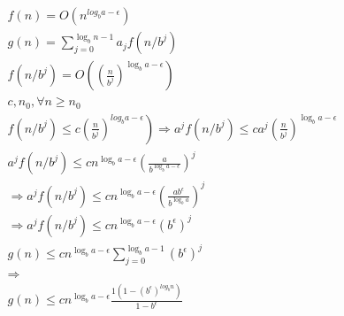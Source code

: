 $$
  \begin{array}{l}
    f(n)=O\left(n^{l o g_{b} a-\epsilon}\right)                                                                                                                                                              \\
    g(n)=\sum_{j=0}^{\log _{b} n-1} a_{j} f\left(n / b^{j}\right)                                                                                                                                            \\
    f\left(n / b^{j}\right)=O\left(\left(\frac{n}{b^{j}}\right)^{\log _{b} a-\epsilon}\right)                                                                                                                \\
    c, n_{0}, \forall n \geq n_{0}                                                                                                                                                                           \\
    \left.f\left(n / b^{j}\right) \leq c\left(\frac{n}{b^{j}}\right)^{l o g_{b} a-\epsilon}\right) \Rightarrow a^{j} f\left(n / b^{j}\right) \leq c a^{j}\left(\frac{n}{b^{j}}\right)^{\log _{b} a-\epsilon} \\
    a^{j} f\left(n / b^{j}\right) \leq c n^{\log _{b} a-\epsilon}\left(\frac{a}{b^{\log _{b} a-\epsilon}}\right)^{j}                                                                                         \\
    \Rightarrow a^{j} f\left(n / b^{j}\right) \leq c n^{\log _{b} a-\epsilon}\left(\frac{a b^{\epsilon}}{b^{\log _{b} a}}\right)^{j}                                                                         \\
    \Rightarrow a^{j} f\left(n / b^{j}\right) \leq c n^{\log _{b} a-\epsilon}\left(b^{\epsilon}\right)^{j}                                                                                                   \\
    g(n) \leq c n^{\log _{b} a-\epsilon} \sum_{j=0}^{\log _{b} a-1}\left(b^{\epsilon}\right)^{j}                                                                                                             \\
    \Rightarrow                                                                                                                                                                                              \\g(n) \leq c n^{\log _{b} a-\epsilon} \frac{1\left(1-\left(b^{\epsilon}\right)^{l o g_{b} n}\right)}{1-b^{\epsilon}}

\end{array}$$
